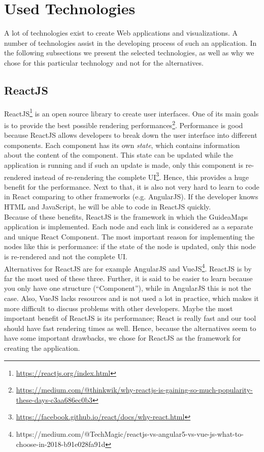 \section{Used Technologies}\label{sec:technologies}
A lot of technologies exist to create Web applications and visualizations. A number of technologies assist in the developing process of such an application. In the following subsections we present the selected technologies, as well as why we chose for this particular technology and not for the alternatives.

\subsection{ReactJS}\label{sec:reactjs}
ReactJS\footnote{\url{https://reactjs.org/index.html}} is an open source library to create user interfaces. One of its main goals is to provide the best possible rendering performances\footnote{\url{https://medium.com/@thinkwik/why-reactjs-is-gaining-so-much-popularity-these-days-c3aa686ec0b3}}. Performance is good because ReactJS allows developers to break down the user interface into different components. Each component has its own \textit{state}, which contains information about the content of the component. This state can be updated while the application is running and if such an update is made, only this component is re-rendered instead of re-rendering the complete UI\footnote{\url{https://facebook.github.io/react/docs/why-react.html}}. Hence, this provides a huge benefit for the performance. Next to that, it is also not very hard to learn to code in React comparing to other frameworks (e.g. AngularJS). If the developer knows HTML and JavaScript, he will be able to code in ReactJS quickly.\\

Because of these benefits, ReactJS is the framework in which the GuideaMaps application is implemented. Each node and each link is considered as a separate and unique React Component. The most important reason for implementing the nodes like this is performance: if the state of the node is updated, only this node is re-rendered and not the complete UI.\\

Alternatives for ReactJS are for example AngularJS and VueJS\footnote{https://medium.com/@TechMagic/reactjs-vs-angular5-vs-vue-js-what-to-choose-in-2018-b91e028fa91d}. ReactJS is by far the most used of these three. Further, it is said to be easier to learn because you only have one structure (``Component''), while in AngularJS this is not the case. Also, VueJS lacks resources and is not used a lot in practice, which makes it more difficult to discuss problems with other developers. Maybe the most important benefit of ReactJS is its performance; React is really fast and our tool should have fast rendering times as well. Hence, because the alternatives seem to have some important drawbacks, we chose for ReactJS as the framework for creating the application. 

